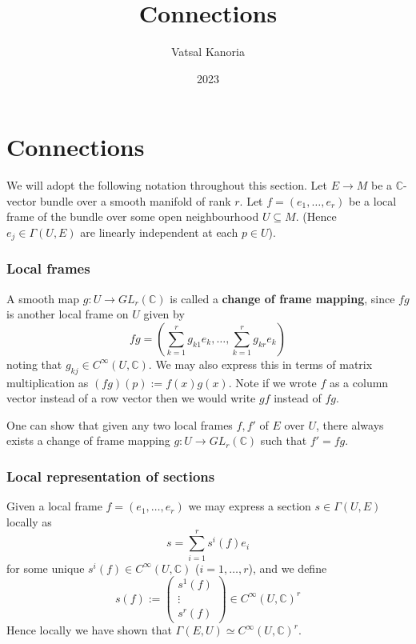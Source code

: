 \documentclass[a4paper]{article}
\theoremstyle{definition} \newtheorem*{definition}{Definition}
\theoremstyle{definition} \newtheorem*{definitions}{Definitions}
\theoremstyle{plain} \newtheorem{theorem}{Theorem}[section]
\theoremstyle{plain} \newtheorem{proposition}[theorem]{Proposition}
\theoremstyle{plain} \newtheorem{corollary}[theorem]{Corollary}
\theoremstyle{plain} \newtheorem{lemma}[theorem]{Lemma}
\theoremstyle{plain} \newtheorem{example}[theorem]{Example}
\newcommand{\defn}[1]{\textbf{#1}}
\newcommand{\complexnos}{\mathbb{C}}
\newcommand{\smoothCmaps}{C^\infty (U, \complexnos)}
\begin{document}
\title{Connections}
\author{Vatsal Kanoria}
\date{2023}
\maketitle

\tableofcontents

\section{Connections}
We will adopt the following notation throughout this section. Let $E\to M$ be a $\complexnos$-vector bundle over a smooth manifold of rank $r$.
Let $f=(e_1,\ldots, e_r)$ be a local frame of the bundle over some open neighbourhood $U\subseteq M$. (Hence $e_j\in \Gamma(U, E)$ are linearly independent at each $p\in U$).

\subsubsection{Local frames}
A smooth map $g:U\to GL_r(\complexnos)$ is called a \defn{change of frame mapping}, since $fg$ is another local frame on $U$ given by 
$$fg=(\sum_{k=1}^r g_{k1}e_k,\ldots, \sum_{k=1}^r g_{kr}e_k)$$
noting that $g_{kj}\in \smoothCmaps$. We may also express this in terms of matrix multiplication as $(fg)(p):=f(x)g(x)$. Note if we wrote $f$ as a column vector instead of a row vector then we would write $gf$ instead of $fg$.

One can show that given any two local frames $f, f'$ of $E$ over $U$, there always exists a change of frame mapping $g:U\to GL_r(\complexnos)$ such that $f'=fg$. 

\subsubsection{Local representation of sections}
Given a local frame $f=(e_1,\ldots, e_r)$ we may express a section $s\in \Gamma(U, E)$ locally as
$$s=\sum_{i=1}^r s^i(f)e_i$$
for some unique $s^i(f)\in \smoothCmaps$ ($i=1,\ldots, r$), and we define 
$$s(f):= \begin{pmatrix}s^1(f) \\ \vdots \\ s^r(f)\end{pmatrix} \in \smoothCmaps^r$$
Hence locally we have shown that $\Gamma(E, U) \simeq \smoothCmaps^r$.
\end{document}
